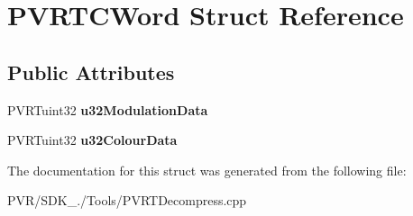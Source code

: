\hypertarget{struct_p_v_r_t_c_word}{\section{P\+V\+R\+T\+C\+Word Struct Reference}
\label{struct_p_v_r_t_c_word}
}
\subsection*{Public Attributes}
\begin{DoxyCompactItemize}
\item 
\hypertarget{struct_p_v_r_t_c_word_ae12ca0da27d24b9f6085bd5ab734383a}{P\+V\+R\+Tuint32 {\bfseries u32\+Modulation\+Data}}\label{struct_p_v_r_t_c_word_ae12ca0da27d24b9f6085bd5ab734383a}

\item 
\hypertarget{struct_p_v_r_t_c_word_ab6a0b0f63f218618ef6f13eb996e07e7}{P\+V\+R\+Tuint32 {\bfseries u32\+Colour\+Data}}\label{struct_p_v_r_t_c_word_ab6a0b0f63f218618ef6f13eb996e07e7}

\end{DoxyCompactItemize}


The documentation for this struct was generated from the following file\+:\begin{DoxyCompactItemize}
\item 
P\+V\+R/\+S\+D\+K\+\_./\+Tools/P\+V\+R\+T\+Decompress.\+cpp\end{DoxyCompactItemize}
